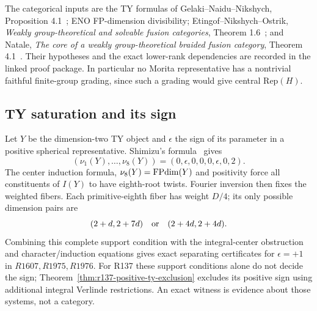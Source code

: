 The categorical inputs are the TY formulas of Gelaki--Naidu--Nikshych,
Proposition 4.1~\cite{RetryGNN}; ENO FP-dimension divisibility; Etingof--Nikshych--Ostrik,
\emph{Weakly group-theoretical and solvable fusion categories},
Theorem 1.6~\cite{RetryENO}; and Natale, \emph{The core of a weakly group-theoretical
braided fusion category}, Theorem 4.1~\cite{RetryNatale}. Their hypotheses and the exact
lower-rank dependencies are recorded in the linked proof package.
In particular no Morita representative has a nontrivial faithful
finite-group grading, since such a grading would give central Rep$(H)$.

\subsection{TY saturation and its sign}
Let $Y$ be the dimension-two TY object and $\epsilon$ the sign of its
parameter in a positive spherical representative. Shimizu's formula~\cite{RetryShimizu} gives
\[
 (\nu_1(Y),\ldots,\nu_8(Y))=(0,\epsilon,0,0,0,\epsilon,0,2).
\]
The center induction formula, $\nu_8(Y)=\operatorname{FPdim}(Y)$ and positivity force
all constituents of $I(Y)$ to have eighth-root twists. Fourier inversion
then fixes the weighted fibers. Each primitive-eighth fiber has weight
$D/4$; its only possible dimension pairs are
\[
 (2+d,2+7d)\quad\hbox{or}\quad(2+4d,2+4d).
\]
Combining this complete support condition with the integral-center
obstruction and character/induction equations gives exact separating
certificates for $\epsilon=+1$ in $R1607,R1975,R1976$. For R137 these support conditions alone do not decide the sign; Theorem~\ref{thm:r137-positive-ty-exclusion} excludes its positive sign using additional integral Verlinde restrictions.
An exact witness is evidence about those systems, not a category.

